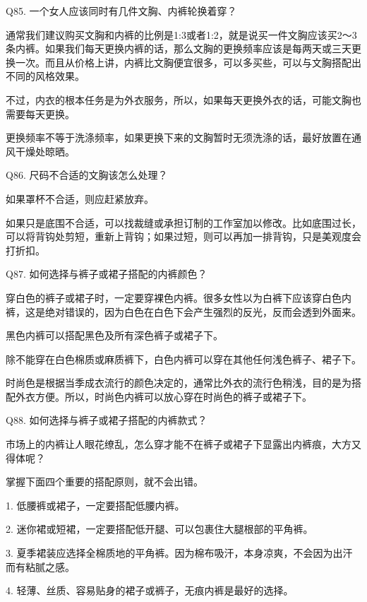 \documentclass[12pt,UTF8]{ctexbook}
\begin{document}
Q85. 一个女人应该同时有几件文胸、内裤轮换着穿？


通常我们建议购买文胸和内裤的比例是1:3或者1:2，就是说买一件文胸应该买2～3条内裤。如果我们每天更换内裤的话，那么文胸的更换频率应该是每两天或三天更换一次。而且从价格上讲，内裤比文胸便宜很多，可以多买些，可以与文胸搭配出不同的风格效果。

不过，内衣的根本任务是为外衣服务，所以，如果每天更换外衣的话，可能文胸也需要每天更换。

更换频率不等于洗涤频率，如果更换下来的文胸暂时无须洗涤的话，最好放置在通风干燥处晾晒。





Q86. 尺码不合适的文胸该怎么处理？


如果罩杯不合适，则应赶紧放弃。

如果只是底围不合适，可以找裁缝或承担订制的工作室加以修改。比如底围过长，可以将背钩处剪短，重新上背钩；如果过短，则可以再加一排背钩，只是美观度会打折扣。





Q87. 如何选择与裤子或裙子搭配的内裤颜色？


穿白色的裤子或裙子时，一定要穿裸色内裤。很多女性以为白裤下应该穿白色内裤，这是绝对错误的，因为白色在白色下会产生强烈的反光，反而会透到外面来。

黑色内裤可以搭配黑色及所有深色裤子或裙子下。

除不能穿在白色棉质或麻质裤下，白色内裤可以穿在其他任何浅色裤子、裙子下。

时尚色是根据当季成衣流行的颜色决定的，通常比外衣的流行色稍浅，目的是为搭配外衣方便。所以，时尚色内裤可以放心穿在时尚色的裤子或裙子下。





Q88. 如何选择与裤子或裙子搭配的内裤款式？


市场上的内裤让人眼花缭乱，怎么穿才能不在裤子或裙子下显露出内裤痕，大方又得体呢？


掌握下面四个重要的搭配原则，就不会出错。

1. 低腰裤或裙子，一定要搭配低腰内裤。

2. 迷你裙或短裙，一定要搭配低开腿、可以包裹住大腿根部的平角裤。

3. 夏季裙装应选择全棉质地的平角裤。因为棉布吸汗，本身凉爽，不会因为出汗而有粘腻之感。

4. 轻薄、丝质、容易贴身的裙子或裤子，无痕内裤是最好的选择。
\end{document}
